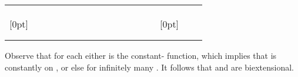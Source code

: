 \documentclass{LMCS}
\begin{document}
\begin{center}
\begin{tabular}{c ccc  ccc ccc cc  ccccc}
        &   \multicolumn{1}{c|}{}     \\  & \multicolumn{1}{|c}{} &    \multicolumn{1}{c}{} & \multicolumn{1}{c}{}      &  \multicolumn{1}{c}{} &    \multicolumn{1}{c}{} & \multicolumn{1}{c}{}      &  \multicolumn{1}{c}{} &    \multicolumn{1}{c}{} & \multicolumn{1}{c}{}     &  \multicolumn{1}{c}{}  &  \multicolumn{1}{c|}{} &                    \multicolumn{1}{c}{} & \multicolumn{1}{c}{}  & \multicolumn{1}{c}{} & \multicolumn{1}{c|}{} \\  & \multicolumn{1}{|c}{} &    \multicolumn{1}{c}{} & \multicolumn{1}{c}{}      &  \multicolumn{1}{c}{} &    \multicolumn{1}{c}{} & \multicolumn{1}{c}{}      &  \multicolumn{1}{c}{} &    \multicolumn{1}{c}{} & \multicolumn{1}{c}{}     &  \multicolumn{1}{c}{}  &  \multicolumn{1}{c|}{} &                    \multicolumn{1}{c}{} & \multicolumn{1}{c}{}  & \multicolumn{1}{c}{} & \multicolumn{1}{c|}{} \\  \cline{13-16}
        \raisebox{-4.5ex}[0pt]{}           & \multicolumn{1}{|c}{} &    \multicolumn{1}{c}{} & \multicolumn{1}{c}{}      &  \multicolumn{1}{c}{} &    \multicolumn{1}{c}{} & \multicolumn{1}{c}{}      &  \multicolumn{1}{c}{} &    \multicolumn{1}{c}{} & \multicolumn{1}{c}{}     &  \multicolumn{1}{c}{}  &  \multicolumn{1}{c|}{}     &  \multicolumn{1}{c}{}
       &  \multicolumn{1}{c}{}  & \multicolumn{1}{c}{\raisebox{-4.5ex}[0pt]{}}
        &   \multicolumn{1}{c|}{}     \\  & \multicolumn{1}{|c}{} &    \multicolumn{1}{c}{} & \multicolumn{1}{c}{}      &  \multicolumn{1}{c}{} &    \multicolumn{1}{c}{} & \multicolumn{1}{c}{}      &  \multicolumn{1}{c}{} &    \multicolumn{1}{c}{} & \multicolumn{1}{c}{}     &  \multicolumn{1}{c}{}  &  \multicolumn{1}{c|}{} &                    \multicolumn{1}{c}{} & \multicolumn{1}{c}{}  & \multicolumn{1}{c}{} & \multicolumn{1}{c|}{} \\  & \multicolumn{1}{|c}{} &    \multicolumn{1}{c}{} & \multicolumn{1}{c}{}      &  \multicolumn{1}{c}{} &    \multicolumn{1}{c}{} & \multicolumn{1}{c}{}      &  \multicolumn{1}{c}{} &    \multicolumn{1}{c}{} & \multicolumn{1}{c}{}     &  \multicolumn{1}{c}{}  &  \multicolumn{1}{c|}{} &                    \multicolumn{1}{c}{} & \multicolumn{1}{c}{}  & \multicolumn{1}{c}{} & \multicolumn{1}{c|}{} \\  \cline{2-16}

    \end{tabular}
\end{center}
Observe that for each  either  is the constant-
function, which implies that  is constantly  on
, or else  for infinitely many . It
follows that  and  are biextensional.
\end{document}
